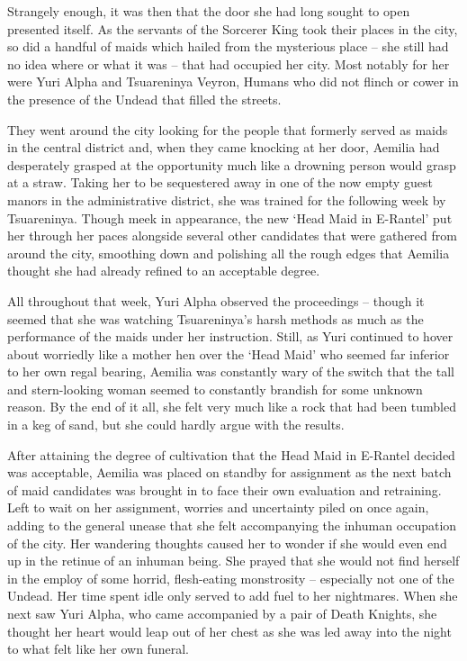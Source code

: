  

Strangely enough, it was then that the door she had long sought to open presented itself. As the servants of the Sorcerer King took their places in the city, so did a handful of maids which hailed from the mysterious place – she still had no idea where or what it was – that had occupied her city. Most notably for her were Yuri Alpha and Tsuareninya Veyron, Humans who did not flinch or cower in the presence of the Undead that filled the streets.

 

They went around the city looking for the people that formerly served as maids in the central district and, when they came knocking at her door, Aemilia had desperately grasped at the opportunity much like a drowning person would grasp at a straw. Taking her to be sequestered away in one of the now empty guest manors in the administrative district, she was trained for the following week by Tsuareninya. Though meek in appearance, the new ‘Head Maid in E-Rantel’ put her through her paces alongside several other candidates that were gathered from around the city, smoothing down and polishing all the rough edges that Aemilia thought she had already refined to an acceptable degree.

 

All throughout that week, Yuri Alpha observed the proceedings – though it seemed that she was watching Tsuareninya’s harsh methods as much as the performance of the maids under her instruction. Still, as Yuri continued to hover about worriedly like a mother hen over the ‘Head Maid’ who seemed far inferior to her own regal bearing, Aemilia was constantly wary of the switch that the tall and stern-looking woman seemed to constantly brandish for some unknown reason. By the end of it all, she felt very much like a rock that had been tumbled in a keg of sand, but she could hardly argue with the results.

 

After attaining the degree of cultivation that the Head Maid in E-Rantel decided was acceptable, Aemilia was placed on standby for assignment as the next batch of maid candidates was brought in to face their own evaluation and retraining. Left to wait on her assignment, worries and uncertainty piled on once again, adding to the general unease that she felt accompanying the inhuman occupation of the city. Her wandering thoughts caused her to wonder if she would even end up in the retinue of an inhuman being. She prayed that she would not find herself in the employ of some horrid, flesh-eating monstrosity – especially not one of the Undead. Her time spent idle only served to add fuel to her nightmares. When she next saw Yuri Alpha, who came accompanied by a pair of Death Knights, she thought her heart would leap out of her chest as she was led away into the night to what felt like her own funeral.

